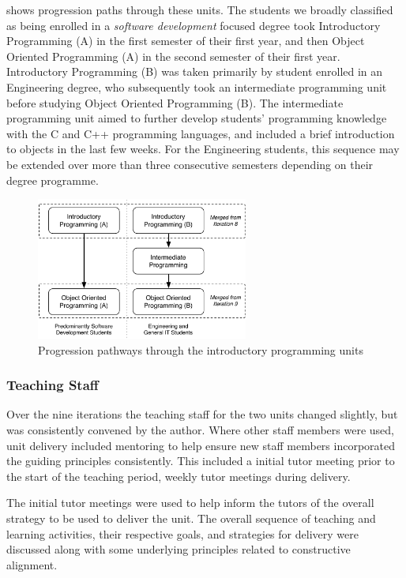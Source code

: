  shows progression paths through these units. The students we broadly classified as being enrolled in a \emph{software development} focused degree took Introductory Programming (A) in the first semester of their first year, and then Object Oriented Programming (A) in the second semester of their first year. Introductory Programming (B) was taken primarily by student enrolled in an Engineering degree, who subsequently took an intermediate programming unit before studying Object Oriented Programming (B). The intermediate programming unit aimed to further develop students' programming knowledge with the C and C++ programming languages, and included a brief introduction to objects in the last few weeks. For the Engineering students, this sequence may be extended over more than three consecutive semesters depending on their degree programme.

\begin{figure}[htbp]
  \centering
  \includegraphics[width=0.62\textwidth]{UnitPaths}
  \caption{Progression pathways through the introductory programming units}
  \label{fig:unit_paths}
\end{figure}


\subsubsection{Teaching Staff} %
\label{ssub:teaching_staff}

Over the nine iterations the teaching staff for the two units changed slightly, but was consistently convened by the author. Where other staff members were used, unit delivery included mentoring to help ensure new staff members incorporated the guiding principles consistently. This included a initial tutor meeting prior to the start of the teaching period, weekly tutor meetings during delivery. 

The initial tutor meetings were used to help inform the tutors of the overall strategy to be used to deliver the unit. The overall sequence of teaching and learning activities, their respective goals, and strategies for delivery were discussed along with some underlying principles related to constructive alignment.

